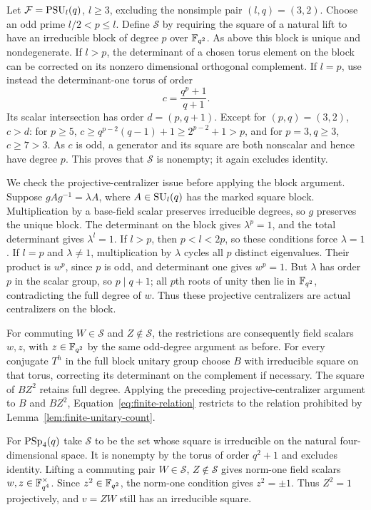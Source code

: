 Let $\mathcal F=\operatorname{PSU}_l(q)$, $l\ge3$, excluding the nonsimple pair
$(l,q)=(3,2)$. Choose an odd prime $l/2<p\le l$. Define
$\mathcal S$ by requiring the square of a natural lift to have an
irreducible block of degree $p$ over $\mathbb F_{q^2}$. As above this
block is unique and nondegenerate. If $l>p$, the determinant of a
chosen torus element on the block can be corrected on its nonzero
dimensional orthogonal complement. If $l=p$, use instead the
determinant-one torus of order
\[
 c=\frac{q^p+1}{q+1}.
\]
Its scalar intersection has order $d=(p,q+1)$. Except for
$(p,q)=(3,2)$, $c>d$: for $p\ge5$,
$c\ge q^{p-2}(q-1)+1\ge2^{p-2}+1>p$, and for $p=3,q\ge3$,
$c\ge7>3$. As $c$ is odd, a generator and its square are both
nonscalar and hence have degree $p$. This proves that
$\mathcal S$ is nonempty; it again excludes identity.

We check the projective-centralizer issue before applying the block
argument. Suppose $gAg^{-1}=\lambda A$, where $A\in\operatorname{SU}_l(q)$ has
the marked square block. Multiplication by a base-field scalar
preserves irreducible degrees, so $g$ preserves the unique block.
The determinant on the block gives $\lambda^p=1$, and the total
determinant gives $\lambda^l=1$. If $l>p$, then $p<l<2p$, so these
conditions force $\lambda=1$. If $l=p$ and $\lambda\ne1$, multiplication
by $\lambda$ cycles all $p$ distinct eigenvalues. Their product is
$w^p$, since $p$ is odd, and determinant one gives $w^p=1$.
But $\lambda$ has order $p$ in the scalar group, so $p\mid q+1$;
all $p$th roots of unity then lie in $\mathbb F_{q^2}$, contradicting
the full degree of $w$. Thus these projective centralizers are
actual centralizers on the block.

For commuting $W\in\mathcal S$ and $Z\notin\mathcal S$, the
restrictions are consequently field scalars $w,z$, with
$z\in\mathbb F_{q^2}$ by the same odd-degree argument as before.
For every conjugate $T^h$ in the full block unitary group choose
$B$ with irreducible square on that torus, correcting its determinant
on the complement if necessary. The square of $BZ^2$ retains full
degree. Applying the preceding projective-centralizer argument
to $B$ and $BZ^2$, Equation~\eqref{eq:finite-relation} restricts to
the relation prohibited by Lemma~\ref{lem:finite-unitary-count}.

For $\operatorname{PSp}_4(q)$ take $\mathcal S$ to be the set whose square is
irreducible on the natural four-dimensional space. It is nonempty
by the torus of order $q^2+1$ and excludes identity. Lifting a
commuting pair $W\in\mathcal S$, $Z\notin\mathcal S$ gives norm-one
field scalars $w,z\in\mathbb F_{q^4}^\times$. Since $z^2\in\mathbb F_{q^2}$,
the norm-one condition gives $z^2=\pm1$. Thus $Z^2=1$ projectively,
and $v=ZW$ still has an irreducible square.

